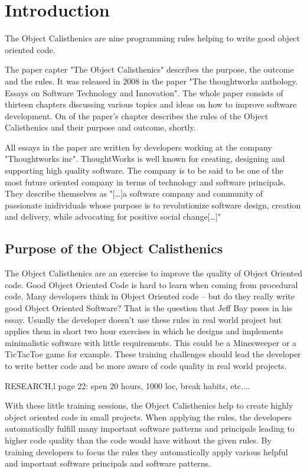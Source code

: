 \chapter{Introduction}
\label{Introduction}
The Object Calisthenics are nine programming rules helping to write good object oriented code.

The paper capter "The Object Calisthenics" describes the purpose, the outcome and the rules. It was released in 2008 in the paper "The thoughtworks anthology. Essays on Software Technology and Innovation"\cite[p. 70-79]{oc2008}. The whole paper consists of thirteen chapters discussing various topics and ideas on how to improve software development. On of the paper's chapter describes the rules of the Object Calisthenics and their purpose and outcome, shortly.

All essays in the paper are written by developers working at the company "Thoughtworks inc". ThoughtWorks is well known for creating, designing and supporting high quality software. The company is to be said to be one of the most future oriented company in terms of technology and software principals. They describe themselves as "[\dots]a software company and community of passionate inidividuals whose purpose is to revolutionize software design, creation and delivery, while advocating for positive social change[\dots]"\cite{twWeb}

\section{Purpose of the Object Calisthenics}
The Object Calisthenics are an exercise to improve the quality of Object Oriented code. Good Object Oriented Code is hard to learn when coming from procedural code. Many developers think in Object Oriented code – but do they really write good Object Oriented Software? That is the question that Jeff Bay poses in his essay. 
Usually the developer doesn't use these rules in real world project but applies them in short two hour exercises in which he designs and implements minimalistic software with little requirements. This could be a Minesweeper or a TicTacToe game for example. These training challenges should lead the developer to write better code and be more aware of code quality in real world projects.

RESEARCH,l page 22: spen 20 hours, 1000 loc, break habits, etc....

With these little training sessions, the Object Calisthenics help to create highly object oriented code  in small projects. When applying the rules, the developers automatically fulfill many important software patterns and principals leading to higher code quality than the code would have without the given rules. By training developers to focus the rules they automatically apply various helpful and important software principals and software patterns. 

